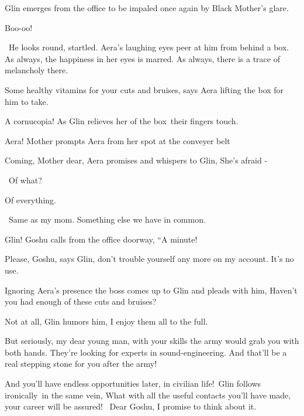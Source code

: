 \documentclass[twoside,11pt]{book}
\begin{document}
Glin emerges from the office to be impaled once again by Black Mother's glare. 

{\textquotedbl}Boo-oo!{\textquotedbl}

~He looks round, startled. Aera's laughing eyes peer at him from behind a box. As always, the happiness in her eyes is
marred. As always, there is a trace of melancholy there.

{\textquotedbl}Some healthy vitamins for your cuts and bruises,{\textquotedbl} says Aera lifting the box for him to
take. 

{\textquotedbl}A cornucopia!{\textquotedbl} As Glin relieves her of the box~their fingers touch.

{\textquotedbl}Aera!{\textquotedbl} Mother prompts Aera from her spot at the conveyer belt 

{\textquotedbl}Coming, Mother dear,{\textquotedbl} Aera promises and whispers to Glin, {\textquotedbl}She's afraid
-{\textquotedbl}\ 

~{\textquotedbl}Of what?{\textquotedbl} 

{\textquotedbl}Of everything.{\textquotedbl} 

~{\textquotedbl}Same as my mom. Something else we have in common.{\textquotedbl}

{\textquotedbl}Glin!{\textquotedbl} Goshu calls from the office doorway, ``A minute!{\textquotedbl} 

{\textquotedbl}Please, Goshu,{\textquotedbl} says Glin, {\textquotedbl}don't trouble yourself any more on my account.
It's no use.{\textquotedbl}

Ignoring Aera's presence the boss comes up to Glin and pleads with him, {\textquotedbl}Haven't you had enough of these
cuts and bruises?{\textquotedbl}

{\textquotedbl}Not at all,{\textquotedbl} Glin humors him, {\textquotedbl}I enjoy them all to the full.{\textquotedbl}

{\textquotedbl}But seriously, my dear young man, with your skills the army would grab you with both hands. They're
looking for experts in sound-engineering. And that'll be a real stepping stone for you after the army!{\textquotedbl} 

{\textquotedbl}And you'll have endless opportunities later, in civilian life!{\textquotedbl}\  Glin follows
ironically{\ }in the same vein, {\textquotedbl}What with all the useful contacts you'll have made, your
career will be assured! ~Dear Goshu, I promise to think about it.{\textquotedbl} 
\end{document}
